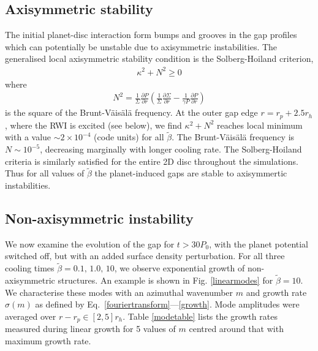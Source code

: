 \subsection{Axisymmetric stability}
The initial planet-disc interaction form bumps and grooves in the gap profiles
which can potentially be unstable due to axisymmetric instabilities. The
generalised local axisymmetric stability condition is the Solberg-Hoiland
criterion,  
\begin{align}
  \kappa^2+N^2 \geq 0 
\end{align}
where
\begin{align}
 N^2=\frac{1}{\Sigma} \frac{\partial P}{\partial r}
 \left(\frac{1}{\Sigma} \frac{\partial \Sigma}{\partial
     r}-\frac{1}{\gamma P} \frac{\partial P}{\partial r}  \right) 
\end{align}
is the square of the Brunt-V\"ais\"al\"a frequency. 
At the outer gap edge $r=r_p+2.5r_h$,  where the RWI is excited
(see below), we find $\kappa^2 + N^2$ reaches local minimum with a value
$\sim 2\times10^{-4}$ (code units) for all $\tilde\beta$. The
Brunt-V\"ais\"al\"a frequency is $N\sim 10^{-5}$, decreasing marginally with longer cooling rate. 
The Solberg-Hoiland criteria is similarly satisfied for the entire 2D disc throughout the 
simulations.
Thus for all values of $\tilde\beta$ the planet-induced gaps are
stable to axisymmertic instabilities. 



\subsection{Non-axisymmetric instability}\label{linear}
We now examine the evolution of the gap for $t>30P_0$, with the
planet potential switched off, but with an added surface density
perturbation. For all three cooling times $\tilde{\beta}=0.1,\, 1.0,\,
10$, we observe exponential growth of non-axisymmetric
structures. An example is shown in Fig. \ref{linearmodes} for 
$\tilde{\beta}=10$. We characterise these
modes with an azimuthal wavenumber $m$ and growth rate $\sigma(m)$ as defined by
Eq.~\ref{fouriertransform}---\ref{growth}. Mode amplitudes were
averaged over $r-r_p\in[2,5]r_h$. Table \ref{modetable}
lists the growth rates measured during 
linear growth for 5 values of $m$ centred around that with maximum
growth rate. 

